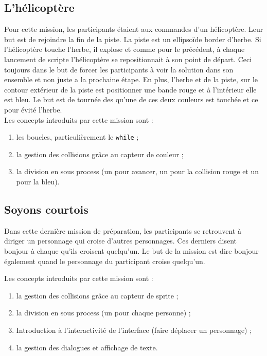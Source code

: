 \subsection{L'hélicoptère}
Pour cette mission, les participants étaient aux commandes d'un hélicoptère. Leur but est de rejoindre la fin de la piste. La piste est un ellipsoïde border d'herbe. Si l'hélicoptère touche l'herbe, il explose et comme pour le précédent, à chaque lancement de scripte l'hélicoptère se repositionnait à son point de départ. Ceci toujours dans le but de forcer les participants à voir la solution dans son ensemble et non juste a la prochaine étape. En plus, l'herbe et de la piste, sur le contour extérieur de la piste est positionner une bande rouge et à l'intérieur elle est bleu. Le but est de tournée des qu'une de ces deux couleurs est touchée et ce pour évité l'herbe.\\

Les concepts introduits par cette mission sont :
\begin{enumerate}
\item les boucles, particulièrement le \texttt{while} ;
\item la gestion des collisions grâce au capteur de couleur ;
\item la division en sous process (un pour avancer, un pour la collision rouge et un pour la bleu).
\end{enumerate}

\subsection{Soyons courtois}
Dans cette dernière mission de préparation, les participants se retrouvent à diriger un personnage qui croise d'autres personnages. Ces derniers disent bonjour à chaque qu'ils croisent quelqu'un. Le but de la mission est dire bonjour également quand le personnage du participant croise quelqu'un.

Les concepts introduits par cette mission sont :
\begin{enumerate}
\item la gestion des collisions grâce au capteur de sprite ;
\item la division en sous process (un pour chaque personne) ;
\item Introduction à l'interactivité de l'interface (faire déplacer un personnage) ;
\item la gestion des dialogues et affichage de texte.
\end{enumerate}


